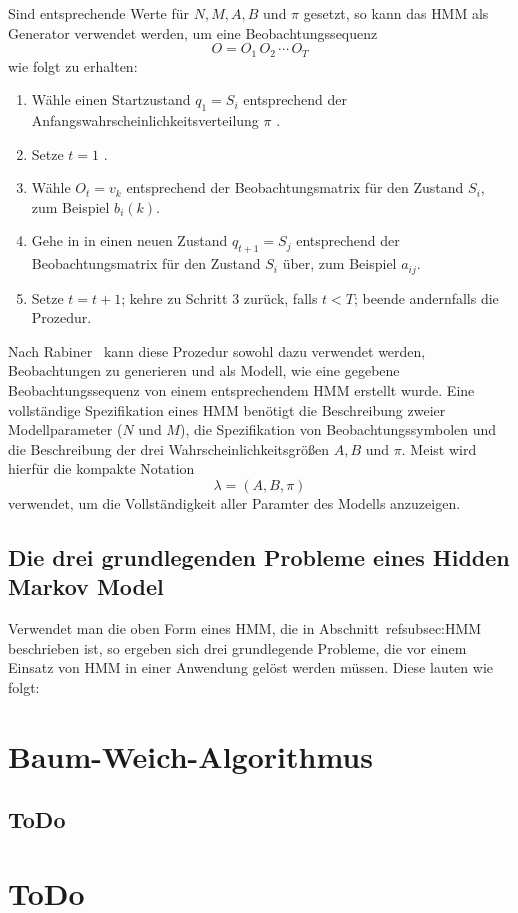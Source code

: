 Sind entsprechende Werte f\"ur $N, M, A, B$ und $\pi$ gesetzt, so kann das \acrshort{HMM} als Generator verwendet werden, um eine Beobachtungssequenz 
\begin{equation}
O = O_1 \, O_2 \, \cdots \, O_T
\end{equation}
wie folgt zu erhalten:
\begin{enumerate}
\item W\"ahle einen Startzustand $q_1 = S_i$ entsprechend der Anfangswahrscheinlichkeitsverteilung $\pi$ .
\item Setze $t = 1$ .
\item W\"ahle $O_t = v_k$ entsprechend der Beobachtungsmatrix f\"ur den Zustand $S_i$, zum Beispiel $b_i(k)$.
\item Gehe in in einen neuen Zustand $q_{t+1} = S_j$ entsprechend der Beobachtungsmatrix f\"ur den Zustand $S_i$ \"uber, zum Beispiel $a_{ij}$.
\item Setze $t = t+ 1$; kehre zu Schritt 3 zur\"uck, falls $t < T$; beende andernfalls die Prozedur.
\end{enumerate}
Nach Rabiner~\cite[S. 5]{bib:hmmrabiner} kann diese Prozedur sowohl dazu verwendet werden, Beobachtungen zu generieren und als Modell, wie eine gegebene Beobachtungssequenz von einem entsprechendem \acrshort{HMM} erstellt wurde.
\newline
Eine vollst\"andige Spezifikation eines \acrshort{HMM} ben\"otigt die Beschreibung zweier Modellparameter ($N$ und $M$), die Spezifikation von Beobachtungssymbolen und die Beschreibung der drei Wahrscheinlichkeitsgr\"o\ss en $A, B$ und $\pi$.
Meist wird hierf\"ur die kompakte Notation
\begin{equation}
\lambda = (A, B, \pi)
\end{equation}
verwendet, um die Vollst\"andigkeit aller Paramter des Modells anzuzeigen.

\subsection[Die drei grundlegenden Probleme eines Hidden Markov Model]{Die drei grundlegenden Probleme eines Hidden Markov Model }
Verwendet man die oben Form eines \acrshort{HMM}, die in Abschnitt~ref{subsec:HMM} beschrieben ist, so ergeben sich drei grundlegende Probleme, die vor einem Einsatz von \gls{HMM} in einer Anwendung gel\"ost werden m\"ussen. Diese lauten wie folgt:


\section{Baum-Weich-Algorithmus}

\subsection{ToDo}

\section{ToDo}
